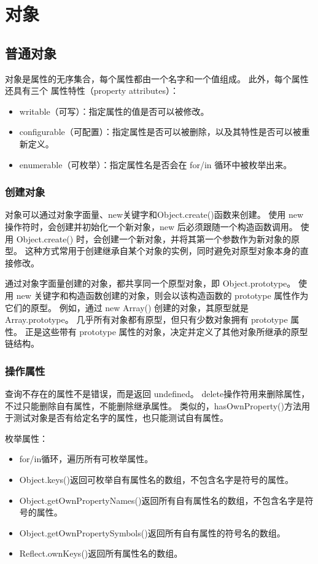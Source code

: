 \section{对象}
\subsection{普通对象}
对象是属性的无序集合，每个属性都由一个名字和一个值组成。
此外，每个属性还具有三个 属性特性（property attributes）：
\begin{itemize}
	\item writable（可写）：指定属性的值是否可以被修改。
	\item configurable（可配置）：指定属性是否可以被删除，以及其特性是否可以被重新定义。
	\item enumerable（可枚举）：指定属性名是否会在 for/in 循环中被枚举出来。
\end{itemize}

\subsubsection{创建对象}
对象可以通过对象字面量、new关键字和Object.create()函数来创建。
使用 new 操作符时，会创建并初始化一个新对象，new 后必须跟随一个构造函数调用。
使用 Object.create() 时，会创建一个新对象，并将其第一个参数作为新对象的原型。
这种方式常用于创建继承自某个对象的实例，同时避免对原型对象本身的直接修改。

通过对象字面量创建的对象，都共享同一个原型对象，即 Object.prototype。
使用 new 关键字和构造函数创建的对象，则会以该构造函数的 prototype 属性作为它们的原型。
例如，通过 new Array() 创建的对象，其原型就是 Array.prototype。
几乎所有对象都有原型，但只有少数对象拥有 prototype 属性。
正是这些带有 prototype 属性的对象，决定并定义了其他对象所继承的原型链结构。

\subsubsection{操作属性}
查询不存在的属性不是错误，而是返回 undefined。
delete操作符用来删除属性，不过只能删除自有属性，不能删除继承属性。
类似的，hasOwnProperty()方法用于测试对象是否有给定名字的属性，也只能测试自有属性。

枚举属性：
\begin{itemize}
	\item for/in循环，遍历所有可枚举属性。
	\item Object.keys()返回可枚举自有属性名的数组，不包含名字是符号的属性。
	\item Object.getOwnPropertyNames()返回所有自有属性名的数组，不包含名字是符号的属性。
	\item Object.getOwnPropertySymbols()返回所有自有属性的符号名的数组。
	\item Reflect.ownKeys()返回所有属性名的数组。
\end{itemize}

